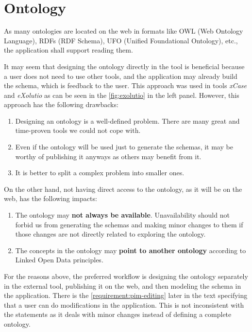 \section{Ontology}

\begin{requirement}
    \label{requirement:ontologies-on-the-web}
    As many ontologies are located on the web in formats like OWL (Web Ontology Language), RDFs (RDF Schema), UFO (Unified Foundational Ontology), etc., the application shall support reading them.
\end{requirement}

It may seem that designing the ontology directly in the tool is beneficial because a user does not need to use other tools, and the application may already build the schema, which is feedback to the user. This approach was used in tools \textit{xCase} and \textit{eXolutio} as can be seen in the \autoref{fig:exolutio} in the left panel. However, this approach has the following drawbacks:

\begin{enumerate}
    \item Designing an ontology is a well-defined problem. There are many great and time-proven tools we could not cope with.
    \item Even if the ontology will be used just to generate the schemas, it may be worthy of publishing it anyways as others may benefit from it.
    \item It is better to split a complex problem into smaller ones.
\end{enumerate}

On the other hand, not having direct access to the ontology, as it will be on the web, has the following impacts:

\begin{enumerate}
    \item The ontology may \textbf{not always be available}. Unavailability should not forbid us from generating the schemas and making minor changes to them if those changes are not directly related to exploring the ontology.
    \item The concepts in the ontology may \textbf{point to another ontology} according to Linked Open Data principles.
\end{enumerate}

For the reasons above, the preferred workflow is designing the ontology separately in the external tool, publishing it on the web, and then modeling the schema in the application. There is the \autoref{requirement:pim-editing} later in the text specifying that a user can do modifications in the application. This is not inconsistent with the statements as it deals with minor changes instead of defining a complete ontology.

